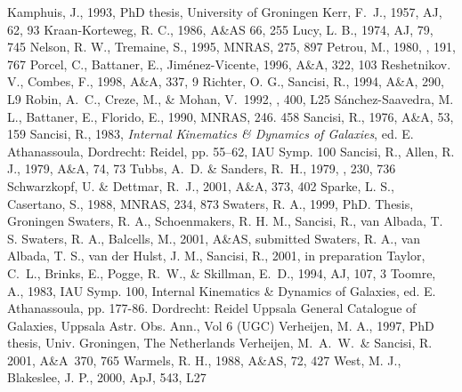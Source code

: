 \documentclass{aa}
\begin{document}
\begin{thebibliography}{}
Kamphuis, J., 1993, PhD thesis, University of Groningen
Kerr, F.~J., 1957, AJ, 62, 93
Kraan-Korteweg, R. C., 1986, A\&AS 66, 255
Lucy, L. B., 1974, AJ, 79, 745
Nelson, R. W., Tremaine, S., 1995, MNRAS, 275, 897
{Petrou}, M., 1980, \mnras, 191, 767
Porcel, C., Battaner, E., Jim\'enez-Vicente, 1996, A\&A, 322, 103
Reshetnikov. V., Combes, F., 1998, A\&A, 337, 9
Richter, O. G., Sancisi, R., 1994, A\&A, 290, L9
Robin, A.~C., Creze, M., \& Mohan, V.\ 1992, \apj, 400, L25
S\'anchez-Saavedra, M. L., Battaner, E., Florido, E., 1990, MNRAS,
246. 458 
Sancisi, R., 1976, A\&A, 53, 159
Sancisi, R., 1983, {\em Internal Kinematics \& Dynamics of Galaxies\/}, ed. E.
  Athanassoula, Dordrecht: Reidel, pp. 55--62, IAU Symp. 100
Sancisi, R., Allen, R. J., 1979, A\&A, 74, 73
{Tubbs}, A.~D. \& {Sanders}, R.~H., 1979, \apj, 230, 736
Schwarzkopf, U. \& Dettmar, R.~J., 2001, A\&A, 373, 402
Sparke, L. S., Casertano, S., 1988, MNRAS, 234, 873
Swaters, R. A., 1999, PhD. Thesis, Groningen
Swaters, R. A., Schoenmakers, R. H. M., Sancisi, R., van Albada, T. S.
Swaters, R. A., Balcells, M., 2001, A\&AS, submitted
Swaters, R. A., van Albada, T. S., van der Hulst, J. M., Sancisi, R.,
2001, in preparation
Taylor, C.~L., Brinks, E., Pogge, R.~W., \& Skillman, E.~D., 1994, AJ, 107, 3
Toomre, A., 1983, IAU Symp. 100, Internal Kinematics \&
Dynamics of Galaxies, ed. E. Athanassoula, pp. 177-86. Dordrecht: Reidel 
Uppsala General Catalogue of Galaxies, Uppsala Astr. Obs. Ann., Vol 6 (UGC)
Verheijen, M. A., 1997, PhD thesis, Univ. Groningen, The Netherlands
Verheijen, M.~A.~W.~\& Sancisi, R. 2001, A\&A\, 370, 765
Warmels, R. H., 1988, A\&AS, 72, 427
West, M. J., Blakeslee, J. P., 2000, ApJ, 543, L27

\end{thebibliography}
\end{document}
